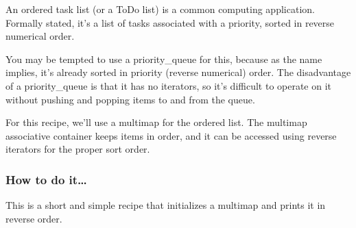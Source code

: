 
An ordered task list (or a ToDo list) is a common computing application. Formally stated, it's a list of tasks associated with a priority, sorted in reverse numerical order.

You may be tempted to use a priority\_queue for this, because as the name implies, it's already sorted in priority (reverse numerical) order. The disadvantage of a priority\_queue is that it has no iterators, so it's difficult to operate on it without pushing and popping items to and from the queue.

For this recipe, we'll use a multimap for the ordered list. The multimap associative container keeps items in order, and it can be accessed using reverse iterators for the proper sort order.

\subsubsection{How to do it…}

This is a short and simple recipe that initializes a multimap and prints it in reverse order.


